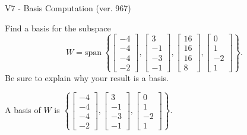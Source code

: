\begin{exercise}
  \begin{exerciseTitle}V7 - Basis Computation (ver. 967)\end{exerciseTitle}
  \begin{exerciseStatement}
    Find a basis for the subspace 
\[W=\mathrm{span}\ \left\{\left[\begin{array}{r}
-4 \\
-4 \\
-4 \\
-2
\end{array}\right] , \left[\begin{array}{r}
3 \\
-1 \\
-3 \\
-1
\end{array}\right] , \left[\begin{array}{r}
16 \\
16 \\
16 \\
8
\end{array}\right] , \left[\begin{array}{r}
0 \\
1 \\
-2 \\
1
\end{array}\right]\right\}.\]
 Be sure to explain why your result is a basis.


  \end{exerciseStatement}
  \begin{exerciseAnswer}
   A basis of \(W\) is  \(\left\{\left[\begin{array}{r}
-4 \\
-4 \\
-4 \\
-2
\end{array}\right] , \left[\begin{array}{r}
3 \\
-1 \\
-3 \\
-1
\end{array}\right] , \left[\begin{array}{r}
0 \\
1 \\
-2 \\
1
\end{array}\right]\right\}\).
  


  \end{exerciseAnswer}
\end{exercise}